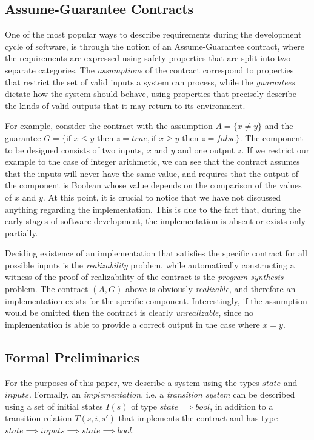 \subsection{Assume-Guarantee Contracts}

One of the most popular ways to describe requirements during the development
cycle of software, is through the notion of an Assume-Guarantee contract, where
the requirements are expressed using safety properties that are split into two separate categories. The
\emph{assumptions} of the contract correspond to properties that restrict the
set of valid inputs a system can process, while the \emph{guarantees} dictate
how the system should behave, using properties that precisely describe
the kinds of valid outputs that it may return to its environment.

For example, consider the contract with the assumption $A = \{x\neq
y\}$ and the guarantee $G = \{\text{if } x \leq y \text{ then } z =
\textit{true}, \text{if } x \geq y \text{ then } z =
\textit{false}\}$. The component to be designed consists of two
inputs, $x$ and $y$ and one output $z$. If we restrict our example to
the case of integer arithmetic, we can see that the contract assumes
that the inputs will never have the same value, and requires that the
output of the component is Boolean whose value depends on the
comparison of the values of $x$ and $y$. At this point, it is crucial
to notice that we have not discussed anything regarding the
implementation. This is due to the fact that, during the early stages
of software development, the implementation is absent or exists only
partially.

Deciding existence of an implementation that satisfies the specific
contract for all possible inputs is the \emph{realizability} problem,
while automatically constructing a witness of the proof of
realizability of the contract is the \emph{program synthesis} problem.
The contract $(A,G)$ above is obviously \emph{realizable}, and
therefore an implementation exists for the specific component.
Interestingly, if the assumption would be omitted then the contract is
clearly \emph{unrealizable}, since no implementation is able to
provide a correct output in the case where $x=y$.

\subsection{Formal Preliminaries}
\label{sec:pre}

For the purposes of this paper, we describe a system using the types
$state$ and $inputs$. Formally, an \emph{implementation}, i.e. a
\emph{transition system} can be described using a set of initial states $I(s)$ of type $state \implies bool$, in addition to a transition relation $T(s,i,s')$ that
implements the contract and has type $state \implies inputs \implies
state \implies bool$.
 
